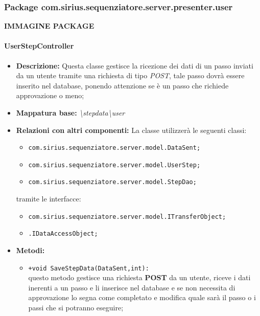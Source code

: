\subsubsection{Package com.sirius.sequenziatore.server.presenter.user}
\textbf{IMMAGINE PACKAGE}
\paragraph{UserStepController}%
\begin{itemize}
	\item \textbf{Descrizione: } Questa classe gestisce la ricezione dei dati di un passo inviati da un utente tramite una richiesta di tipo \textit{POST}, tale passo dovrà essere inserito nel database, ponendo attenzione se è un passo che richiede approvazione o meno;
	\item \textbf{Mappatura base: } \textit{\textbackslash stepdata\textbackslash user}
	\item \textbf{Relazioni con altri componenti: }
	La classe utilizzerà le seguenti classi:
	\begin{itemize}
		\item \texttt{com.sirius.sequenziatore.server.model.DataSent;}
		\item \texttt{com.sirius.sequenziatore.server.model.UserStep;}
		\item \texttt{com.sirius.sequenziatore.server.model.StepDao;}
	\end{itemize}
	tramite le interfacce:
	\begin{itemize}
		\item \texttt{com.sirius.sequenziatore.server.model.ITransferObject;}
		\item \texttt{\sModel .IDataAccessObject;}
	\end{itemize}
	\item \textbf{Metodi: }\begin{itemize}
					\item \texttt{+void SaveStepData(DataSent,int):}\\
					questo metodo gestisce una richiesta \textbf{POST} da un utente, riceve i dati inerenti a un passo e li inserisce nel database e se non necessita di approvazione lo segna come completato e modifica quale sarà il passo o i passi che si potranno eseguire; 
				\end{itemize}
\end{itemize}
